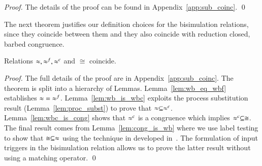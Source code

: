 \begin{proof}
	The details of the proof can be found in Appendix~\ref{app:sub_coinc}.
	\qed
\end{proof}

The next theorem justifies our definition choices
for the bisimulation relations, since
they coincide between them and they also
coincide with reduction closed, barbed congruence.

\begin{theorem}[Coincidence]\rm
	\label{the:coincidence}
	Relations $\approx, \approx^f, \approx^{c}$ and $\cong$ coincide.
\end{theorem}

\begin{proof}
	The full details of the proof are in Appendix~\ref{app:sub_coinc}.
	The theorem is split into a hierarchy of Lemmas. 
	Lemma~\ref{lem:wb_eq_wbf} establishes $\approx\ =\ \approx^{f}$.
	Lemma~\ref{lem:wb_is_wbc} exploits the process substitution result
	(Lemma~\ref{lem:proc_subst}) to prove that $\approx \subseteq \approx^{c}$.
	Lemma~\ref{lem:wbc_is_cong} shows that $\approx^{c}$ is a congruence
	which implies $\approx^{c} \subseteq \cong$.
	The final result comes from Lemma~\ref{lem:cong_is_wb} where
	we use label testing to show that $\cong \subseteq \approx$ using
	the technique in developed in~\cite{Hennessy07}. The formulation of input
	triggers in the bisimulation relation allows us to prove
	the latter result without using a matching operator.
	\qed
\end{proof}

%

